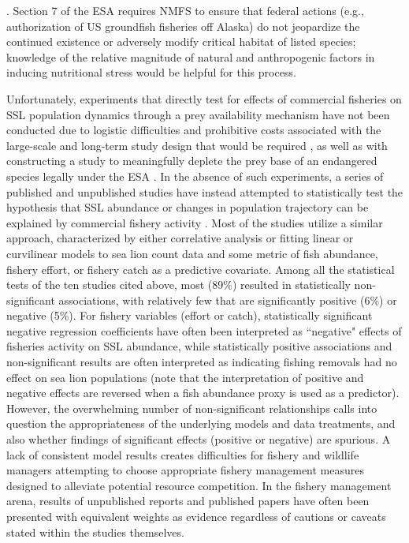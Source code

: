 \documentclass[11pt]{article}
\begin{document}
\citep{NMFS2003,NMFS2008}.   Section 7 of the ESA requires NMFS to ensure that federal actions (e.g., authorization of US groundfish fisheries off Alaska) do not jeopardize the continued existence or adversely modify critical habitat of listed species; knowledge of the relative magnitude of natural and anthropogenic factors in inducing nutritional stress would be helpful for this process.

Unfortunately, experiments that directly test for effects of commercial fisheries on SSL population dynamics through a prey availability mechanism have not been conducted due to logistic difficulties and prohibitive costs associated with the large-scale and long-term study design that would be required \citep{FerreroFritz2002}, as well as with constructing a study to meaningfully deplete the prey base of an endangered species legally under the ESA \citep{Bryant2009}. In the absence of such experiments, a series of published and unpublished studies have instead attempted to statistically test the hypothesis that SSL abundance or changes in population trajectory can be explained by commercial fishery activity \citep{Loughlin:1989kl,Ferrero:1994hc,Sampson:1995cr,Dillingham:2006fv,Hennen:2006bs,Soboleff:2006fk,Calkins:2008ve,afsc:2010dz,
Trites:2010ly,Hui:2011uq}. Most of the studies utilize a similar approach, characterized by either correlative analysis or fitting linear or curvilinear models to sea lion count data and some metric of fish abundance, fishery effort, or fishery catch as a predictive covariate. Among all the statistical tests of the ten studies cited above, most (89\%) resulted in statistically non-significant associations, with relatively few that are significantly positive (6\%) or negative (5\%). For fishery variables (effort or catch), statistically significant negative regression coefficients have often been interpreted as ``negative" effects of fisheries activity on SSL abundance, while statistically positive associations and non-significant results are often interpreted as indicating fishing removals had no effect on sea lion populations (note that the interpretation of positive and negative effects are reversed when a fish abundance proxy is used as a predictor). However, the overwhelming number of non-significant relationships calls into question the appropriateness of the underlying models and data treatments, and also whether findings of significant effects (positive or negative) are spurious. A lack of consistent model results creates difficulties for fishery and wildlife managers attempting to choose appropriate fishery management measures designed to alleviate potential resource competition. In the fishery management arena, results of unpublished reports and published papers have often been presented with equivalent weights as evidence \citep[e.g., see][]{Bernard:2011dq} regardless of cautions or caveats stated within the studies themselves.
\end{document}
